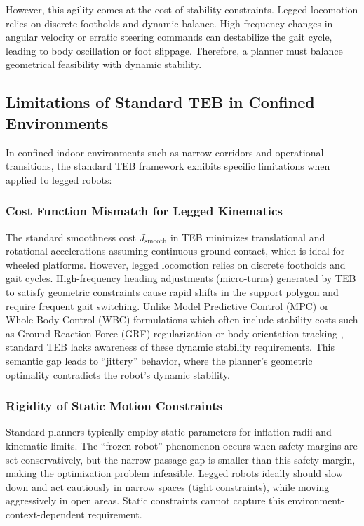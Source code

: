\documentclass[lettersize,journal]{IEEEtran}
\begin{document}
However, this agility comes at the cost of stability constraints. Legged locomotion relies on discrete footholds and dynamic balance. High-frequency changes in angular velocity or erratic steering commands can destabilize the gait cycle, leading to body oscillation or foot slippage. Therefore, a planner must balance geometrical feasibility with dynamic stability.

\subsection{Limitations of Standard TEB in Confined Environments}
In confined indoor environments such as narrow corridors and operational transitions, the standard TEB framework exhibits specific limitations when applied to legged robots:

\subsubsection{Cost Function Mismatch for Legged Kinematics}
The standard smoothness cost $J_{\text{smooth}}$ in TEB minimizes translational and rotational accelerations assuming continuous ground contact, which is ideal for wheeled platforms. However, legged locomotion relies on discrete footholds and gait cycles. High-frequency heading adjustments (micro-turns) generated by TEB to satisfy geometric constraints cause rapid shifts in the support polygon and require frequent gait switching. Unlike Model Predictive Control (MPC) or Whole-Body Control (WBC) formulations which often include stability costs such as Ground Reaction Force (GRF) regularization or body orientation tracking \cite{wensingOptimizationBasedControlDynamic2024}, standard TEB lacks awareness of these dynamic stability requirements. This semantic gap leads to ``jittery'' behavior, where the planner's geometric optimality contradicts the robot's dynamic stability.

\subsubsection{Rigidity of Static Motion Constraints}
Standard planners typically employ static parameters for inflation radii and kinematic limits. The ``frozen robot'' phenomenon occurs when safety margins are set conservatively, but the narrow passage gap is smaller than this safety margin, making the optimization problem infeasible. Legged robots ideally should slow down and act cautiously in narrow spaces (tight constraints), while moving aggressively in open areas. Static constraints cannot capture this environment-context-dependent requirement.
\end{document}
